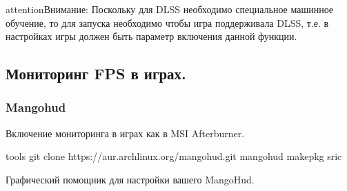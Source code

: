 \documentclass[letterpaper,10pt,russian,openany]{sphinxmanual}
\begin{document}
\begin{sphinxadmonition}{attention}{Внимание:}
\sphinxAtStartPar
Поскольку для DLSS необходимо специальное машинное обучение, то для запуска необходимо чтобы игра поддерживала DLSS, т.е. в настройках игры должен быть параметр включения данной функции. 
\end{sphinxadmonition}

\ignorespaces 

\subsection{Мониторинг FPS в играх.}
\label{\detokenize{source/linux-gaming:fps}}\label{\detokenize{source/linux-gaming:fps-monitoring}}\label{\detokenize{source/linux-gaming:index-19}}
\ignorespaces 

\subsubsection{Mangohud}
\label{\detokenize{source/linux-gaming:mangohud}}\label{\detokenize{source/linux-gaming:index-20}}\label{\detokenize{source/linux-gaming:id13}}
\sphinxAtStartPar
Включение мониторинга в играх как в MSI Afterburner.


\sphinxAtStartPar
{}

\begin{sphinxVerbatim}[commandchars=\\\{\}]
 tools                                             
git clone https://aur.archlinux.org/mangohud.git     
 mangohud                                          
makepkg \PYGZhy{}sric                                        
\end{sphinxVerbatim}

\sphinxAtStartPar
Графический помощник для настройки вашего MangoHud.
\end{document}
